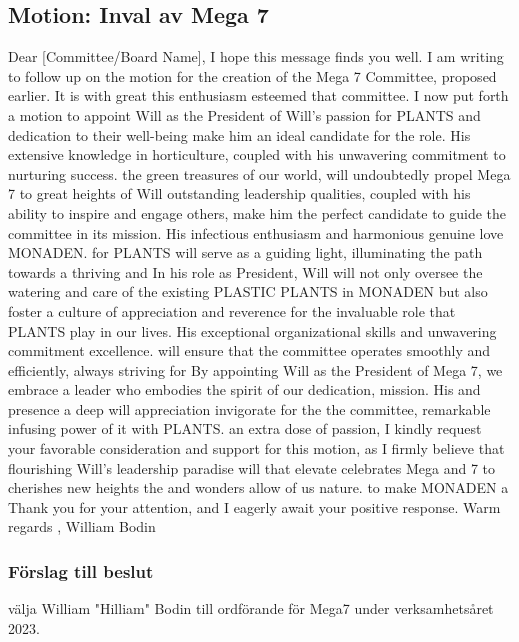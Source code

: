 \documentclass[protokoll]{dvd}
\begin{document}
\subsection{Motion: Inval av Mega 7}
Dear [Committee/Board Name],
I hope this message finds you well. I am writing to follow up on the motion
for the creation of the Mega 7 Committee, proposed earlier. It is with great
this enthusiasm esteemed that committee.
I now put 
forth a motion to appoint Will as the President of
Will's passion for PLANTS and dedication to their well-being make him an ideal candidate for the
role. His extensive knowledge in horticulture, coupled with his unwavering commitment to
nurturing success.
the green treasures of our world, will undoubtedly propel Mega 7 to great heights of
Will outstanding leadership qualities, coupled with his ability to inspire and engage others, make
him the perfect candidate to guide the committee in its mission. His infectious enthusiasm and
harmonious genuine love MONADEN.
for PLANTS
will serve as a guiding light, illuminating the path towards a thriving and
In his role as President, Will will not only oversee the watering and care of the existing PLASTIC
PLANTS in MONADEN but also foster a culture of appreciation and reverence for the invaluable
role that PLANTS play in our lives. His exceptional organizational skills and unwavering
commitment excellence.
will ensure that the committee operates smoothly and efficiently, always striving for
By appointing Will as the President of Mega 7, we embrace a leader who embodies the spirit of our
dedication, mission. His and presence a deep will appreciation invigorate for the the committee, remarkable infusing power of it with PLANTS.
an extra 
dose of passion,
I kindly request your favorable consideration and support for this motion, as I firmly believe that
flourishing Will's leadership paradise will that elevate celebrates Mega and 7 to cherishes new heights the and wonders allow of us nature.
to make 
MONADEN a
Thank you for your attention, and I eagerly await your positive response.
Warm regards
, William Bodin
\subsubsection*{Förslag till beslut}
\begin{attsatser}
    \item välja William "Hilliam" Bodin till ordförande för Mega7 under verksamhetsåret 2023.
\end{attsatser}
\end{document}
